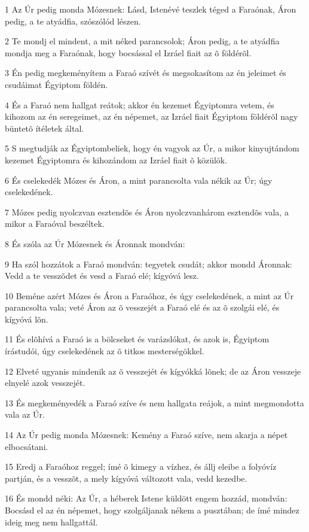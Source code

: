 \par 1 Az Úr pedig monda Mózesnek: Lásd, Istenévé teszlek téged a Faraónak, Áron pedig, a te atyádfia, szószólód lészen.
\par 2 Te mondj el mindent, a mit néked parancsolok; Áron pedig, a te atyádfia mondja meg a Faraónak, hogy bocsással el Izráel fiait az õ földérõl.
\par 3 Én pedig megkeményítem a Faraó szívét és megsokasítom az én jeleimet és csudáimat Égyiptom földén.
\par 4 És a Faraó nem hallgat reátok; akkor én kezemet Égyiptomra vetem, és kihozom az én seregeimet, az én népemet, az Izráel fiait Égyiptom földérõl nagy büntetõ ítéletek által.
\par 5 S megtudják az Égyiptombeliek, hogy én vagyok az Úr, a mikor kinyujtándom kezemet Égyiptomra és kihozándom az Izráel fiait õ közülök.
\par 6 És cselekedék Mózes és Áron, a mint parancsolta vala nékik az Úr; úgy cselekedének.
\par 7 Mózes pedig nyolczvan esztendõs és Áron nyolczvanhárom esztendõs vala, a mikor a Faraóval beszéltek.
\par 8 És szóla az Úr Mózesnek és Áronnak mondván:
\par 9 Ha szól hozzátok a Faraó mondván: tegyetek csudát; akkor mondd Áronnak: Vedd a te vesszõdet és vesd a Faraó elé; kígyóvá lesz.
\par 10 Beméne azért Mózes és Áron a Faraóhoz, és úgy cselekedének, a mint az Úr parancsolta vala; veté Áron az õ vesszejét a Faraó elé és az õ szolgái elé, és kígyóvá lõn.
\par 11 És elõhívá a Faraó is a bölcseket és varázslókat, és azok is, Égyiptom írástudói, úgy cselekedének az õ titkos mesterségökkel.
\par 12 Elveté ugyanis mindenik az õ vesszejét és kígyókká lõnek; de az Áron vesszeje elnyelé azok vesszejét.
\par 13 És megkeményedék a Faraó szíve és nem hallgata reájok, a mint megmondotta vala az Úr.
\par 14 Az Úr pedig monda Mózesnek: Kemény a Faraó szíve, nem akarja a népet elbocsátani.
\par 15 Eredj a Faraóhoz reggel; ímé õ kimegy a vízhez, és állj eleibe a folyóvíz partján, és a vesszõt, a mely kígyóvá változott vala, vedd kezedbe.
\par 16 És mondd néki: Az Úr, a héberek Istene küldött engem hozzád, mondván: Bocsásd el az én népemet, hogy szolgáljanak nékem a pusztában; de ímé mindez ideig meg nem hallgattál.
